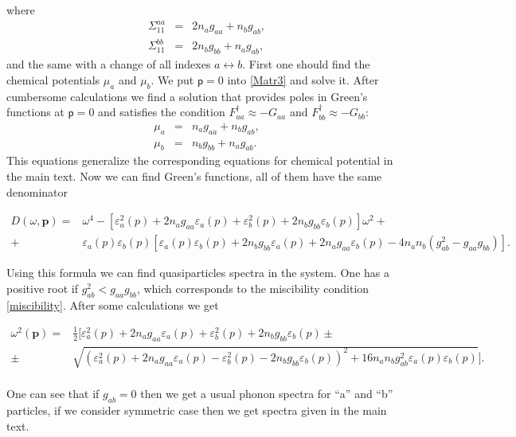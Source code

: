 \documentclass[reprint,superscriptaddress,showpacs,nofootinbib,aps,pra]{revtex4-1}
\begin{document}
where
\begin{eqnarray}
  \Sigma^{aa}_{11} &=& 2 n_a g_{aa} + n_b g_{ab}, \\
  \Sigma^{bb}_{11} &=& 2 n_b g_{bb} + n_a g_{ab},
\end{eqnarray}
and the same with a change of all indexes $a \leftrightarrow b$. First one should find the chemical potentials $\mu_a$ and $\mu_b$. We put $\mathsf p=0$ into \eqref{Matr3} and solve it. After cumbersome calculations we find a solution that provides poles in Green's functions at $\mathsf p=0$ and satisfies the condition $F^\dag_{aa} \approx -G_{aa}$ and $F^\dag_{bb} \approx -G_{bb}$:
\begin{eqnarray}
  \label{Chema}
  \mu_a &=& n_a g_{aa} + n_b g_{ab} ,\\ \label{Chemb}
  \mu_b &=& n_b g_{bb} + n_a g_{ab}.  
\end{eqnarray}
This equations generalize the corresponding equations for chemical potential in the main text. Now we can find Green's functions, all of them have the same denominator
\begin{widetext}
\begin{equation}\label{Den1}
  \begin{split}
    D(\omega, \textbf{p}) = & \omega^4 - \left[ \varepsilon^2_a(p) + 2 n_a g_{aa} \varepsilon_a(p) + \varepsilon^2_b(p) + 2 n_b g_{bb} \varepsilon_b(p) \right] \omega^2 + \\
    + &  \varepsilon_a(p) \varepsilon_b(p) \left[ \varepsilon_a(p) \varepsilon_b(p) + 2 n_b g_{bb} \varepsilon_a(p) + 2 n_a g_{aa} \varepsilon_b(p) - 4 n_a n_b (g^2_{ab} - g_{aa} g_{bb})  \right].
  \end{split}
\end{equation}
\end{widetext}
Using this formula we can find quasiparticles spectra in the system. One has a positive root if $g^2_{ab}<g_{aa} g_{bb}$, which corresponds to the miscibility condition \eqref{miscibility}. After some calculations we get
\begin{widetext}
\begin{equation}\label{Spec2}
  \begin{split}
    \omega^2(\textbf{p})= & \frac{1}{2} \Biggl[ \varepsilon^2_a(p) + 2 n_a g_{aa} \varepsilon_a(p) + \varepsilon^2_b(p) + 2 n_b g_{bb} \varepsilon_b(p) \pm \\ \pm & \sqrt{\left(\varepsilon^2_a(p) + 2 n_a g_{aa} \varepsilon_a(p) - \varepsilon^2_b(p) - 2 n_b g_{bb} \varepsilon_b(p)\right)^2 + 16 n_a n_b g^2_{ab} \varepsilon_a(p) \varepsilon_b(p)  } \Biggr].  \\
  \end{split}
\end{equation}
\end{widetext}
One can see that if $g_{ab}=0$ then we get a usual phonon spectra for ``a'' and ``b'' particles, if we consider symmetric case then we get spectra given in the main text. 
\end{document}
